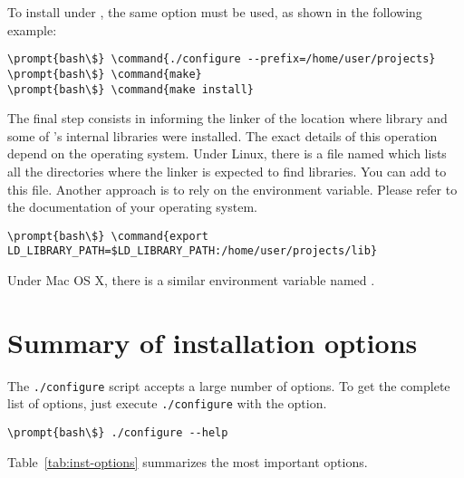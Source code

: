 To install  under ,
the same  option must be used, as shown in the following example:

\begin{Verbatim}[commandchars=\\\{\}]
\prompt{bash\$} \command{./configure --prefix=/home/user/projects}
\prompt{bash\$} \command{make}
\prompt{bash\$} \command{make install}
\end{Verbatim}

The final step consists in informing the linker of the location where
 library and some of 's
internal libraries were installed. The exact details of this operation
depend on the operating system. Under Linux, there is a file named
 which lists all the directories where the
linker is expected to find libraries. You can add
 to this file. Another approach is
to rely on the  environment variable.
Please refer to the documentation of your operating system.

\begin{Verbatim}[commandchars=\\\{\}]
\prompt{bash\$} \command{export LD_LIBRARY_PATH=$LD_LIBRARY_PATH:/home/user/projects/lib}
\end{Verbatim}

Under Mac OS X, there is a similar environment variable named
.

\section{Summary of installation options}
\label{sec:inst-options}

The \verb|./configure| script accepts a large number of options. To
get the complete list of options, just execute \verb|./configure| with
the  option.

\begin{Verbatim}[commandchars=\\\{\}]
\prompt{bash\$} ./configure --help
\end{Verbatim}

Table~\ref{tab:inst-options} summarizes the most important options. 

